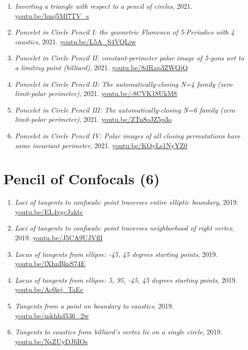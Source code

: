 \documentclass[12pt]{article}
\begin{document}
\begin{enumerate}[resume]
\item \textit{Inverting a triangle with respect to a pencil of circles}, 2021. \href{https://youtu.be/hmj5Mf7TV_s}{\url{youtu.be/hmj5Mf7TV\_s}}
\item \textit{Poncelet in Circle Pencil I: the geometric Flamenco of 5-Periodics with 4 caustics}, 2021. \href{https://youtu.be/L5A_S4VQLiw}{\url{youtu.be/L5A\_S4VQLiw}}
\item \textit{Poncelet in Circle Pencil II: constant-perimeter polar image of 5-gons wrt to a limiting point (billiard)}, 2021. \href{https://youtu.be/8dRap3ZWQjQ}{\url{youtu.be/8dRap3ZWQjQ}}
\item \textit{Poncelet in Circle Pencil II: The automatically-closing N=4 family (zero limit-polar perimeter)}, 2021. \href{https://youtu.be/-8CVK18UkM8}{\url{youtu.be/-8CVK18UkM8}}
\item \textit{Poncelet in Circle Pencil III: The automatically-closing N=6 family (zero limit-polar perimeter)}, 2021. \href{https://youtu.be/ZTn8oJZ5p3o}{\url{youtu.be/ZTn8oJZ5p3o}}
\item \textit{Poncelet in Circle Pencil IV: Polar images of all closing permutations have same invariant perimeter}, 2021. \href{https://youtu.be/KQyLs1NyYZ0}{\url{youtu.be/KQyLs1NyYZ0}}
\end{enumerate}

\section{Pencil of Confocals (6)}

\begin{enumerate}[resume]
\item \textit{Loci of tangents to confocals: point traverses entire elliptic boundary}, 2019. \href{https://youtu.be/EL4vgcJaktc}{\url{youtu.be/EL4vgcJaktc}}
\item \textit{Loci of tangents to confocals: point traverses neighborhood of right vertex}, 2019. \href{https://youtu.be/J5CA9UJVflI}{\url{youtu.be/J5CA9UJVflI}}
\item \textit{Locus of tangents from ellipse: -45, 45 degrees starting points}, 2019. \href{https://youtu.be/lXhnBksS74E}{\url{youtu.be/lXhnBksS74E}}
\item \textit{Locus of tangents from ellipse: 5, 95, -45, 45 degrees starting points}, 2019. \href{https://youtu.be/Ac0iej_TaEc}{\url{youtu.be/Ac0iej\_TaEc}}
\item \textit{Tangents from a point on boundary to caustics}, 2019. \href{https://youtu.be/mkhhd536_2w}{\url{youtu.be/mkhhd536\_2w}}
\item \textit{Tangents to caustics from billiard's vertex lie on a single circle}, 2019. \href{https://youtu.be/NsZUyDJ6IOs}{\url{youtu.be/NsZUyDJ6IOs}}
\end{enumerate}
\end{document}
